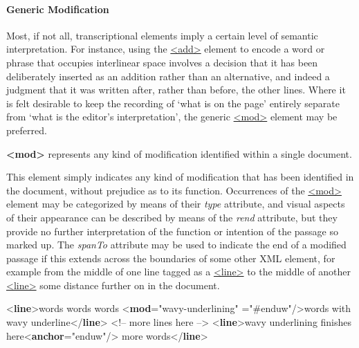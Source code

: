 \paragraph[{Generic Modification}]{Generic Modification}\label{PH-mod}\par
Most, if not all, transcriptional elements imply a certain level of semantic interpretation. For instance, using the \hyperref[TEI.add]{<add>} element to encode a word or phrase that occupies interlinear space involves a decision that it has been deliberately inserted as an addition rather than an alternative, and indeed a judgment that it was written after, rather than before, the other lines. Where it is felt desirable to keep the recording of ‘what is on the page’ entirely separate from ‘what is the editor’s interpretation’, the generic \hyperref[TEI.mod]{<mod>} element may be preferred. 
\begin{sansreflist}
  
\item [\textbf{<mod>}] represents any kind of modification identified within a single document.
\end{sansreflist}
 This element simply indicates any kind of modification that has been identified in the document, without prejudice as to its function. Occurrences of the \hyperref[TEI.mod]{<mod>} element may be categorized by means of their {\itshape type} attribute, and visual aspects of their appearance can be described by means of the {\itshape rend} attribute, but they provide no further interpretation of the function or intention of the passage so marked up. The {\itshape spanTo} attribute may be used to indicate the end of a modified passage if this extends across the boundaries of some other XML element, for example from the middle of one line tagged as a \hyperref[TEI.line]{<line>} to the middle of another \hyperref[TEI.line]{<line>} some distance further on in the document.\par\bgroup{}\exampleFont \begin{shaded}\noindent\mbox{}{<\textbf{line}>}words words words {<\textbf{mod}\hspace*{1em}{rend}="{wavy-underlining}"\mbox{}\newline 
\hspace*{1em}\hspace*{1em}{spanTo}="{\#enduw}"/>}words with wavy\mbox{}\newline 
 underline{</\textbf{line}>} <!-- more lines here --> \mbox{}\newline 
{<\textbf{line}>}wavy underlining finishes\mbox{}\newline 
 here{<\textbf{anchor}\hspace*{1em}{xml:id}="{enduw}"/>} more words{</\textbf{line}>}\end{shaded}\egroup\par \par
